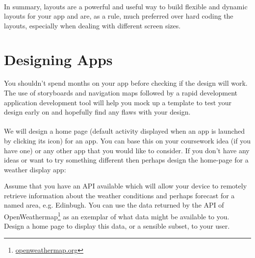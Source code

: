 \documentclass[12pt, a4paper, twoside]{book}
\begin{document}
\paragraph{} In summary, layouts are a powerful and useful way to build flexible and dynamic layouts for your app and are, as a rule, much preferred over hard coding the layouts, especially when dealing with different screen sizes.




\section{Designing Apps}
\paragraph{} You shouldn’t spend months on your app before checking if the design will work. The use of storyboards and navigation maps followed by a rapid development application development tool will help you mock up a template to test your design early on and hopefully find any flaws with your design.

\paragraph{} We will design a home page (default activity displayed when an app is launched by clicking its icon) for an app. You can base this on your coursework idea (if you have one) or any other app that you would like to consider. If you don't have any ideas or want to try something different then perhaps design the home-page for a weather display app:

\begin{framed}
Assume that you have an API available which will allow your device to remotely retrieve information about the weather conditions and perhaps forecast for a named area, e.g. Edinbugh. You can use the data returned by the API of OpenWeathermap\footnote{\url{openweathermap.org}} as an exemplar of what data might be available to you. Design a home page to display this data, or a sensible subset, to your user.
\end{framed}
\end{document}
